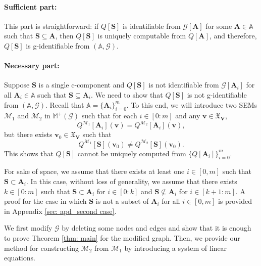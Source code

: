 \documentclass[accepted]{uai2022}
\newcommand{\V}[0]{\mathbf{V}}
\newcommand{\A}[0]{\mathbf{A}}
\newcommand{\G}[0]{\mathcal{G}}
\newcommand{\M}[0]{\mathcal{M}}
\newcommand{\dom}[1]{\mathfrak{X}_{#1}}
\begin{document}
    \paragraph{Sufficient part:}
    This part is straightforward: if $Q[\mathbf{S}]$ is identifiable from $\G[\A]$ for some $\A \in \mathbb{A}$ such that $\mathbf{S} \subseteq \A$, then $Q[\mathbf{S}]$ is uniquely computable from $Q[\A]$, and therefore, $Q[\mathbf{S}]$ is g-identifiable from $(\mathbb{A},\G)$.
    
    \paragraph{Necessary part:}
    Suppose $\mathbf{S}$ is a single c-component and  $Q[\mathbf{S}]$ is not identifiable from $\G[\A_i]$ for all $\A_i \in \mathbb{A}$ such that $\mathbf{S} \subseteq \A_i$. 
    We need to show that $Q[\mathbf{S}]$ is not g-identifiable from $(\mathbb{A},\G)$.
    Recall that $\mathbb{A}=\{\A_i\}_{i=0}^m$.
    To this end, we will introduce two SEMs $\M_1$ and $\M_2$ in $\mathbb{M^+(\G)}$ such that for each $i\in [0:m]$ and any $\mathbf{v} \in \dom{\V}$,
    \begin{equation} \label{eq: same Q over A}
        Q^{\M_1}[\mathbf{A}_i](\mathbf{v}) = Q^{\M_2}[\mathbf{A}_i](\mathbf{v}), 
    \end{equation}
    but there exists $\mathbf{v}_0 \in \dom{\V}$ such that 
    \begin{equation} \label{eq: diff Q over S}
        Q^{\M_1}[\mathbf{S}](\mathbf{v}_0) \neq Q^{\M_2}[\mathbf{S}](\mathbf{v}_0).
    \end{equation}
    This shows that $Q[\mathbf{S}]$ cannot be uniquely computed from $\{Q[\A_i]\}_{i=0}^m$.
    
    For sake of space, we assume that there exists at least one $i\in [0, m]$ such that $\mathbf{S}\subset \mathbf{A}_i$. 
    In this case, without loss of generality, we assume that there exists $k \in [0:m]$ such that  $\mathbf{S}\subset \A_i$ for $i\in [0:k]$ and $\mathbf{S}\nsubseteq \A_i$ for $i\in [k+1:m]$.
    A proof for the case in which $\mathbf{S}$ is not a subset of $\A_i$ for all $i\in [0, m]$ is provided in Appendix \ref{sec: apd_second case}.
    
    We first modify $\G$ by deleting some nodes and edges and show that it is enough to prove Theorem \ref{thm: main} for the modified graph. 
    Then, we provide our method for constructing $\M_2$ from $\M_1$ by introducing a system of linear equations.
\end{document}
